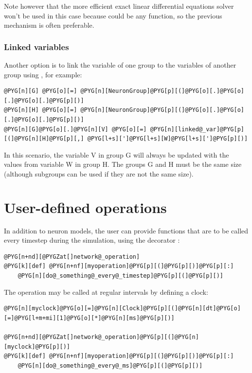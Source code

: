 \documentclass[letterpaper,10pt,english]{manual}
\begin{document}
Note however that the more efficient exact linear differential equations solver won't be used in this
case because  could be any function, so the previous mechanism is often preferable.


\subsubsection{Linked variables}

Another option is to link the variable of one group to the variables of another group using
\hyperlink{brian.linked_var}{}, for example:

\begin{Verbatim}[commandchars=@\[\]]
@PYG[n][G] @PYG[o][=] @PYG[n][NeuronGroup]@PYG[p][(]@PYG[o][.]@PYG[o][.]@PYG[o][.]@PYG[p][)]
@PYG[n][H] @PYG[o][=] @PYG[n][NeuronGroup]@PYG[p][(]@PYG[o][.]@PYG[o][.]@PYG[o][.]@PYG[p][)]
@PYG[n][G]@PYG[o][.]@PYG[n][V] @PYG[o][=] @PYG[n][linked@_var]@PYG[p][(]@PYG[n][H]@PYG[p][,] @PYG[l+s][']@PYG[l+s][W]@PYG[l+s][']@PYG[p][)]
\end{Verbatim}

In this scenario, the variable V in group G will always be updated with
the values from variable W in group H. The groups G and H must be the
same size (although subgroups can be used if they are not the same size).

\resetcurrentobjects
\hypertarget{--doc-operations}{}

\section{User-defined operations}

In addition to neuron models, the user can provide functions that are to be called every timestep
during the simulation, using the decorator \hyperlink{brian.network_operation}{}:

\begin{Verbatim}[commandchars=@\[\]]
@PYG[n+nd][@PYGZat[]network@_operation]
@PYG[k][def] @PYG[n+nf][myoperation]@PYG[p][(]@PYG[p][)]@PYG[p][:]
    @PYG[n][do@_something@_every@_timestep]@PYG[p][(]@PYG[p][)]
\end{Verbatim}

The operation may be called at regular intervals by defining a clock:

\begin{Verbatim}[commandchars=@\[\]]
@PYG[n][myclock]@PYG[o][=]@PYG[n][Clock]@PYG[p][(]@PYG[n][dt]@PYG[o][=]@PYG[l+m+mi][1]@PYG[o][*]@PYG[n][ms]@PYG[p][)]

@PYG[n+nd][@PYGZat[]network@_operation]@PYG[p][(]@PYG[n][myclock]@PYG[p][)]
@PYG[k][def] @PYG[n+nf][myoperation]@PYG[p][(]@PYG[p][)]@PYG[p][:]
    @PYG[n][do@_something@_every@_ms]@PYG[p][(]@PYG[p][)]
\end{Verbatim}
\end{document}
